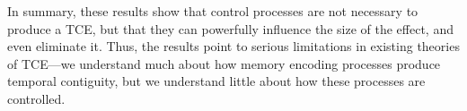 \documentclass[jou,natbib,floatsintext]{apa6} %
\begin{document}
In summary, these results show that control processes are not necessary to produce a TCE, but that they can powerfully influence the size of the effect, and even eliminate it. Thus, the results point to serious limitations in existing theories of TCE---we understand much about how memory encoding processes produce temporal contiguity, but we understand little about how these processes are controlled.


\end{document}

